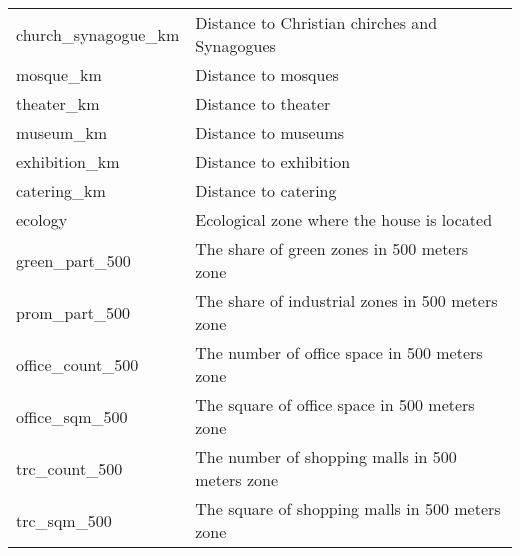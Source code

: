 \begin{longtable}[c]{ll}
    church\_synagogue\_km                      & Distance to Christian chirches and Synagogues                                                                             \\
    mosque\_km                                 & Distance to mosques                                                                                                       \\
    theater\_km                                & Distance to theater                                                                                                       \\
    museum\_km                                 & Distance to museums                                                                                                       \\
    exhibition\_km                             & Distance to exhibition                                                                                                    \\
    catering\_km                               & Distance to catering                                                                                                      \\
    ecology                                    & Ecological zone where the house is located                                                                                \\
    green\_part\_500                           & The share of green zones in 500 meters zone                                                                               \\
    prom\_part\_500                            & The share of industrial zones in 500 meters zone                                                                          \\
    office\_count\_500                         & The number of office space in 500 meters zone                                                                             \\
    office\_sqm\_500                           & The square of office space in 500 meters zone                                                                             \\
    trc\_count\_500                            & The number of shopping malls in 500 meters zone                                                                           \\
    trc\_sqm\_500                              & The square of shopping malls in 500 meters zone                                                                           \\

\end{longtable}
